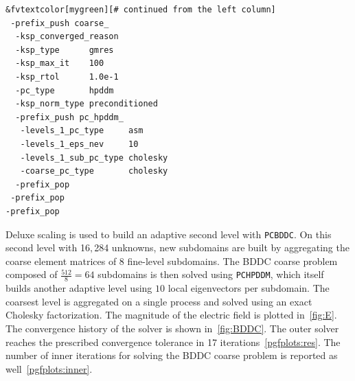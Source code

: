 \documentclass[3p,11pt]{elsarticle}
\newcommand{\pk}[1]{\texttt{#1}}
\begin{document}
\begin{minipage}[t]{0.425\textwidth}
\begin{Verbatim}[fontsize=\footnotesize,frame=single,framerule=0.1mm,commandchars=&\[\]]
&fvtextcolor[mygreen][# continued from the left column]
 -prefix_push coarse_
  -ksp_converged_reason
  -ksp_type      gmres
  -ksp_max_it    100
  -ksp_rtol      1.0e-1
  -pc_type       hpddm
  -ksp_norm_type preconditioned
  -prefix_push pc_hpddm_
   -levels_1_pc_type     asm
   -levels_1_eps_nev     10
   -levels_1_sub_pc_type cholesky
   -coarse_pc_type       cholesky
  -prefix_pop
 -prefix_pop
-prefix_pop
\end{Verbatim}
\end{minipage}
Deluxe scaling is used to build an adaptive second level with \pk{PCBDDC}. On this
second level with 16${,}$284 unknowns, new subdomains are built by aggregating the coarse element matrices of
8 fine-level subdomains. The BDDC coarse problem composed of $\frac{512}{8} =
64$ subdomains is then solved using \pk{PCHPDDM}, which itself builds another adaptive
level using $10$ local eigenvectors per subdomain. The coarsest level is
aggregated on a single process and solved using an exact Cholesky factorization.
The magnitude of the electric field is plotted in~\cref{fig:E}. The
convergence history of the solver is shown in~\cref{fig:BDDC}. The outer solver
reaches the prescribed convergence tolerance in 17 iterations~\ref{pgfplots:res}. The number of
inner iterations for solving the BDDC coarse problem is reported as well~\ref{pgfplots:inner}.
\loadedtableBDDC
\end{document}
